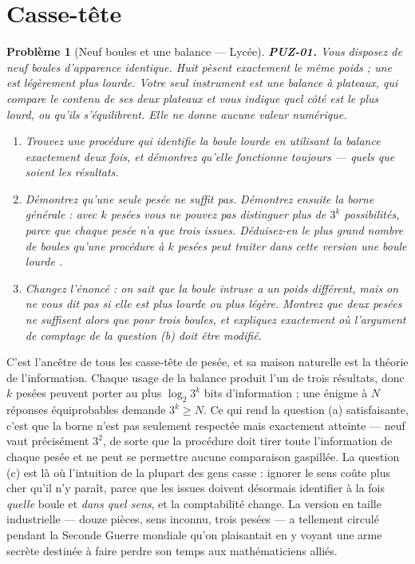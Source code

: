 \documentclass[11pt]{article}
\newtheorem{problem}{Problème}
\begin{document}
\bigskip


\section*{Casse-tête}

\begin{problem}[{Neuf boules et une balance --- Lycée}]
\textbf{PUZ-01.} Vous disposez de neuf boules d'apparence identique. Huit pèsent
exactement le même poids ; une est légèrement plus lourde. Votre seul instrument est une
balance à plateaux, qui compare le contenu de ses deux plateaux et vous indique quel côté
est le plus lourd, ou qu'ils s'équilibrent. Elle ne donne aucune valeur numérique.
\begin{enumerate}
\item[(a)] Trouvez une procédure qui identifie la boule lourde en utilisant la balance exactement
deux fois, et démontrez qu'elle fonctionne toujours --- quels que soient les résultats.
\item[(b)] Démontrez qu'une seule pesée ne suffit pas. Démontrez ensuite la borne générale : avec
$ k $ pesées vous ne pouvez pas distinguer plus de $ 3^{k} $ possibilités, parce que
chaque pesée n'a que trois issues. Déduisez-en le plus grand nombre de boules qu'une
procédure à $ k $ pesées peut traiter dans cette version \og{} une boule lourde \fg{}.
\item[(c)] Changez l'énoncé : on sait que la boule intruse a un poids différent, mais on ne vous
dit \textit{pas} si elle est plus lourde ou plus légère. Montrez que deux pesées ne
suffisent alors que pour trois boules, et expliquez exactement où l'argument de comptage
de la question (b) doit être modifié.
\end{enumerate}

\end{problem}

\noindent C'est l'ancêtre de tous les casse-tête de pesée, et sa maison naturelle
est la théorie de l'information. Chaque usage de la balance produit l'un de trois
résultats, donc $ k $ pesées peuvent porter au plus $ \log_2 3^k $ bits d'information ;
une énigme à $ N $ réponses équiprobables demande $ 3^k \geq N $. Ce qui rend la
question (a) satisfaisante, c'est que la borne n'est pas seulement respectée mais
exactement atteinte --- neuf vaut précisément $ 3^2 $, de sorte que la procédure doit tirer
toute l'information de chaque pesée et ne peut se permettre aucune comparaison gaspillée.
La question (c) est là où l'intuition de la plupart des gens casse : ignorer le sens coûte
plus cher qu'il n'y paraît, parce que les issues doivent désormais identifier à la fois
\textit{quelle} boule et \textit{dans quel sens}, et la comptabilité change. La version en
taille industrielle --- douze pièces, sens inconnu, trois pesées --- a tellement circulé
pendant la Seconde Guerre mondiale qu'on plaisantait en y voyant une arme secrète destinée
à faire perdre son temps aux mathématiciens alliés.
\end{document}
